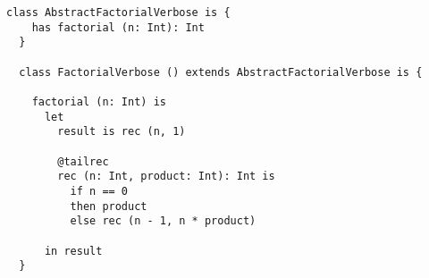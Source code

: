 \begin{lstlisting}[label={lst:exampleFactorialVerbose}]
  class AbstractFactorialVerbose is {
    has factorial (n: Int): Int
  }

  class FactorialVerbose () extends AbstractFactorialVerbose is {

    factorial (n: Int) is
      let
        result is rec (n, 1)

        @tailrec
        rec (n: Int, product: Int): Int is
          if n == 0
          then product
          else rec (n - 1, n * product)

      in result
  }
\end{lstlisting}


